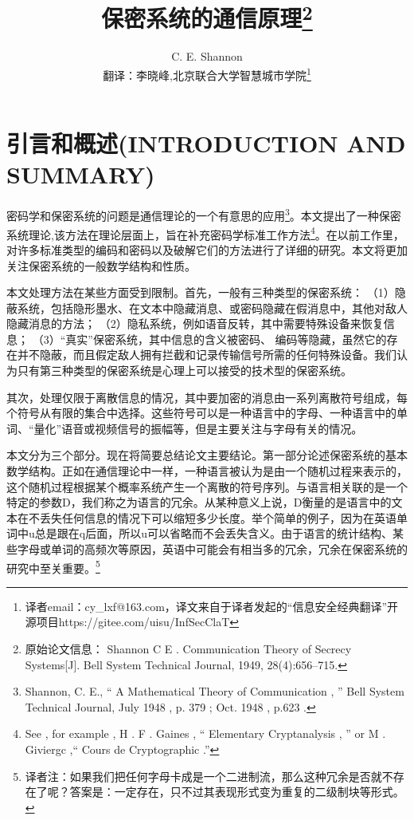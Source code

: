 \documentclass[]{article}
\title{保密系统的通信原理\footnote{原始论文信息： Shannon C E . Communication Theory of Secrecy Systems[J]. Bell System Technical Journal, 1949, 28(4):656–715.}}
\author{C. E. Shannon\\
{\small  翻译：李晓峰,北京联合大学智慧城市学院\footnote{译者email：cy\_lxf@163.com，译文来自于译者发起的“信息安全经典翻译”开源项目https://gitee.com/uisu/InfSecClaT}}
}
\begin{document}
	
\maketitle
	
\newpage
\tableofcontents
\newpage

%   
%
	
	\section{引言和概述(INTRODUCTION AND SUMMARY)}
	密码学和保密系统的问题是通信理论的一个有意思的应用\footnote{Shannon, C. E., “ A Mathematical Theory of Communication , ”
	Bell System Technical Journal, July 1948 , p. 379 ; Oct. 1948 , p.623 .}。本文提出了一种保密系统理论,该方法在理论层面上，旨在补充密码学标准工作方法\footnote{See , for example , H . F . Gaines , “ Elementary Cryptanalysis , ” or M . Giviergc ,“ Cours de Cryptographic .”}。在以前工作里，对许多标准类型的编码和密码以及破解它们的方法进行了详细的研究。本文将更加关注保密系统的一般数学结构和性质。\par


本文处理方法在某些方面受到限制。首先，一般有三种类型的保密系统：
（1）隐蔽系统，包括隐形墨水、在文本中隐藏消息、或密码隐藏在假消息中，其他对敌人隐藏消息的方法；
（2）隐私系统，例如语音反转，其中需要特殊设备来恢复信息；
（3）“真实”保密系统，其中信息的含义被密码、
编码等隐藏，虽然它的存在并不隐蔽，而且假定敌人拥有拦截和记录传输信号所需的任何特殊设备。我们认为只有第三种类型的保密系统是心理上可以接受的技术型的保密系统。
\par

其次，处理仅限于离散信息的情况，其中要加密的消息由一系列离散符号组成，每个符号从有限的集合中选择。这些符号可以是一种语言中的字母、一种语言中的单词、“量化”语音或视频信号的振幅等，但是主要关注与字母有关的情况。
\par

本文分为三个部分。现在将简要总结论文主要结论。第一部分论述保密系统的基本数学结构。正如在通信理论中一样，一种语言被认为是由一个随机过程来表示的，这个随机过程根据某个概率系统产生一个离散的符号序列。与语言相关联的是一个特定的参数D，我们称之为语言的冗余。从某种意义上说，D衡量的是语言中的文本在不丢失任何信息的情况下可以缩短多少长度。举个简单的例子，因为在英语单词中u总是跟在q后面，所以u可以省略而不会丢失含义。由于语言的统计结构、某些字母或单词的高频次等原因，英语中可能会有相当多的冗余，冗余在保密系统的研究中至关重要。\footnote{译者注：如果我们把任何字母卡成是一个二进制流，那么这种冗余是否就不存在了呢？答案是：一定存在，只不过其表现形式变为重复的二级制块等形式。}
\par
\end{document}
